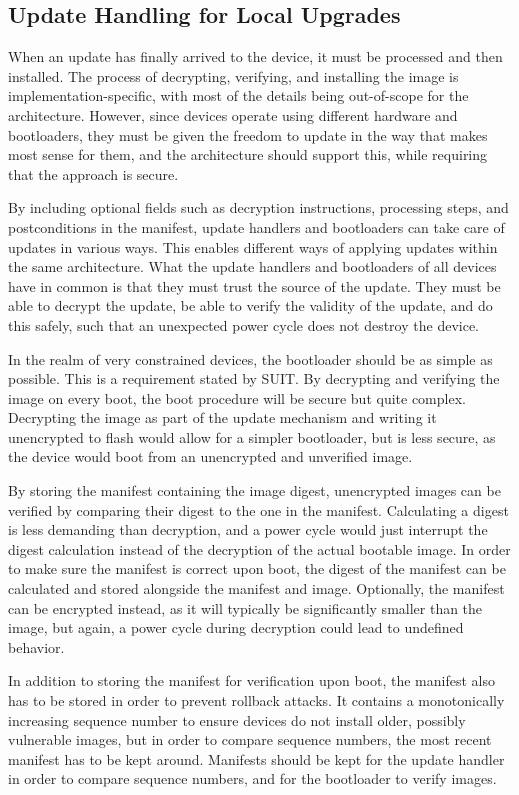 \documentclass[0-thesis.tex]{subfiles}
\begin{document}
\subsection{Update Handling for Local Upgrades}
\label{ssec:upgrading}
When an update has finally arrived to the device, it must be processed and then installed.
The process of decrypting, verifying, and installing the image is implementation-specific,
with most of the details being out-of-scope for the architecture. However, since devices
operate using different hardware and bootloaders, they must be given the freedom to update
in the way that makes most sense for them, and the architecture should support this, while
requiring that the approach is secure.

By including optional fields such as decryption instructions, processing steps, and
postconditions in the manifest, update handlers and bootloaders can take care of updates
in various ways. This enables different ways of applying updates within the same
architecture. What the update handlers and bootloaders of all devices have in common is
that they must trust the source of the update. They must be able to decrypt the update, be
able to verify the validity of the update, and do this safely, such that an unexpected
power cycle does not destroy the device.

In the realm of very constrained devices, the bootloader should be as simple as possible.
This is a requirement stated by SUIT. By decrypting and verifying the image on every boot,
the boot procedure will be secure but quite complex. Decrypting the image as part of the
update mechanism and writing it unencrypted to flash would allow for a simpler bootloader,
but is less secure, as the device would boot from an unencrypted and unverified image.

By storing the manifest containing the image digest, unencrypted images can be verified by
comparing their digest to the one in the manifest. Calculating a digest is less demanding
than decryption, and a power cycle would just interrupt the digest calculation instead of
the decryption of the actual bootable image. In order to make sure the manifest is correct
upon boot, the digest of the manifest can be calculated and stored alongside the manifest
and image. Optionally, the manifest can be encrypted instead, as it will typically be
significantly smaller than the image, but again, a power cycle during decryption could
lead to undefined behavior.

In addition to storing the manifest for verification upon boot, the manifest also has to
be stored in order to prevent rollback attacks. It contains a monotonically increasing
sequence number to ensure devices do not install older, possibly vulnerable images, but in
order to compare sequence numbers, the most recent manifest has to be kept around.
Manifests should be kept for the update handler in order to compare sequence numbers, and
for the bootloader to verify images.
\end{document}
